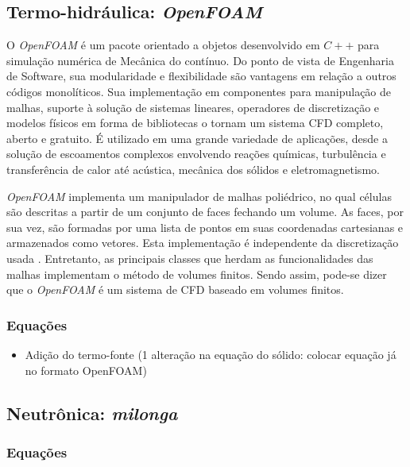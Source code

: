 \subsection{Termo-hidráulica: \textit{OpenFOAM}}
\label{subsection:openfoam}

O \textit{OpenFOAM} é um pacote orientado a objetos desenvolvido em $C++$ para simulação numérica de Mecânica
do contínuo. Do ponto de vista de Engenharia de Software, sua modularidade e flexibilidade são vantagens
em relação a outros códigos monolíticos. Sua implementação em componentes para manipulação de malhas, suporte
à solução de sistemas lineares, operadores de discretização e modelos físicos em forma de bibliotecas o tornam
um sistema CFD completo, aberto e gratuito. É utilizado em uma grande variedade
de aplicações, desde a solução de escoamentos complexos envolvendo reações químicas, turbulência e
transferência de calor até acústica, mecânica dos sólidos e eletromagnetismo. 

\textit{OpenFOAM} implementa um manipulador de malhas poliédrico, no qual células são descritas a partir
de um conjunto de faces fechando um volume. As faces, por sua vez, são formadas por uma lista de pontos
em suas coordenadas cartesianas e armazenados como vetores. Esta implementação é independente da discretização
usada \cite{Jasak2009}. Entretanto, as principais classes que herdam as funcionalidades das malhas implementam o método de
volumes finitos. Sendo assim, pode-se dizer que o \textit{OpenFOAM} é um sistema de CFD baseado em volumes
finitos.

\subsubsection{Equações}

\begin{itemize}
\item Adição do termo-fonte (1 alteração na equação do sólido: colocar equação já no formato OpenFOAM)
\end{itemize}

\subsection{Neutrônica: \textit{milonga}}
\label{subsection:milonga}

\subsubsection{Equações}

